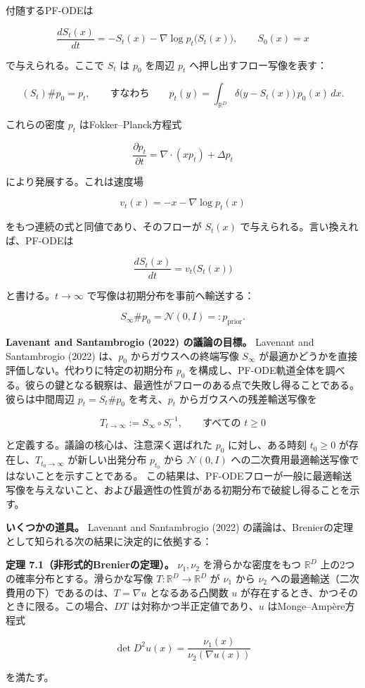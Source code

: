 付随するPF-ODEは

\[
\frac{dS_t(x)}{dt}=-S_t(x)-\nabla\log p_t\bigl(S_t(x)\bigr),\qquad S_0(x)=x
\]


で与えられる。ここで $S_t$ は $p_0$ を周辺 $p_t$ へ押し出すフロー写像を表す：

\[
(S_t)\#p_0=p_t,\qquad\text{すなわち}\qquad
p_t(y)=\int_{\mathbb{R}^D}\delta\bigl(y-S_t(x)\bigr)\,p_0(x)\,dx.
\]


これらの密度 $p_t$ はFokker–Planck方程式

\[
\frac{\partial p_t}{\partial t}=\nabla\cdot(x p_t)+\Delta p_t
\]


により発展する。これは速度場

\[
v_t(x)=-x-\nabla\log p_t(x)
\]


をもつ連続の式と同値であり、そのフローが $S_t(x)$ で与えられる。言い換えれば、PF-ODEは

\[
\frac{dS_t(x)}{dt}=v_t\bigl(S_t(x)\bigr)
\]


と書ける。$t\to\infty$ で写像は初期分布を事前へ輸送する：

\[
S_\infty\#p_0=\mathcal{N}(0,I)=:p_{\mathrm{prior}}.
\]


\textbf{Lavenant and Santambrogio (2022) の議論の目標。} Lavenant and Santambrogio (2022) は、$p_0$ からガウスへの終端写像 $S_\infty$ が最適かどうかを直接評価しない。代わりに特定の初期分布 $p_0$ を構成し、PF-ODE軌道全体を調べる。彼らの鍵となる観察は、最適性がフローのある点で失敗し得ることである。
彼らは中間周辺 $p_t=S_t\#p_0$ を考え、$p_t$ からガウスへの残差輸送写像を

\[
T_{t\to\infty}:=S_\infty\circ S_t^{-1},\qquad\text{すべての }t\ge 0
\]


と定義する。議論の核心は、注意深く選ばれた $p_0$ に対し、ある時刻 $t_0\ge 0$ が存在し、$T_{t_0\to\infty}$ が新しい出発分布 $p_{t_0}$ から $\mathcal{N}(0,I)$ への二次費用最適輸送写像ではないことを示すことである。
この結果は、PF-ODEフローが一般に最適輸送写像を与えないこと、および最適性の性質がある初期分布で破綻し得ることを示す。

\textbf{いくつかの道具。} Lavenant and Santambrogio (2022) の議論は、Brenierの定理として知られる次の結果に決定的に依拠する：

\begin{propositionbox}[定理 7.1（非形式的Brenierの定理）。]
\textbf{定理 7.1（非形式的Brenierの定理）。} $\nu_1,\nu_2$ を滑らかな密度をもつ $\mathbb{R}^D$ 上の2つの確率分布とする。滑らかな写像 $T:\mathbb{R}^D\to\mathbb{R}^D$ が $\nu_1$ から $\nu_2$ への最適輸送（二次費用の下）であるのは、$T=\nabla u$ となるある凸関数 $u$ が存在するとき、かつそのときに限る。この場合、$DT$ は対称かつ半正定値であり、$u$ はMonge–Ampère方程式

\[
\det D^2 u(x)=\frac{\nu_1(x)}{\nu_2(\nabla u(x))}
\]

を満たす。
\end{propositionbox}


